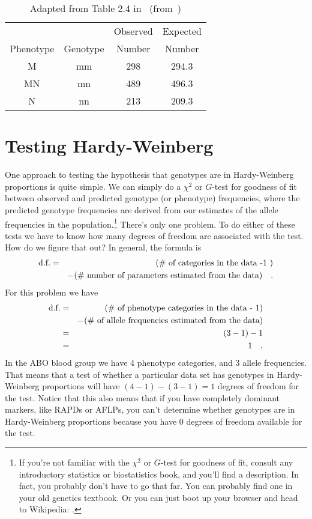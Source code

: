 \documentclass[12pt]{article}
\begin{document}
\begin{table}
\begin{center}
\begin{tabular}{cccc}
\hline\hline
          &          & Observed & Expected \\
Phenotype & Genotype & Number   & Number   \\
\hline
M         & mm       & 298      & 294.3 \\
MN        & mn       & 489      & 496.3 \\
N         & nn       & 213      & 209.3 \\
\hline
\end{tabular}
\end{center}
\caption{Adapted from Table 2.4 in~\cite{Hedrick-2000}
  (from~\cite{Cleghorn-1960})}\label{table:MN-data}
\end{table}

\section*{Testing Hardy-Weinberg}

One approach to testing the hypothesis that genotypes are in
Hardy-Weinberg proportions is quite simple. We can simply do a
$\chi^2$ or $G$-test for goodness of fit between observed and
predicted genotype (or phenotype) frequencies, where the predicted
genotype frequencies are derived from our estimates of the allele
frequencies in the population.\footnote{If you're not familiar with
  the $\chi^2$ or $G$-test for goodness of fit, consult any
  introductory statistics or biostatistics book, and you'll find a
  description. In fact, you probably don't have to go that far. You
  can probably find one in your old genetics textbook. Or you can just
  boot up your browser and head to Wikipedia:
  . } There's only one problem. To do
either of these tests we have to know how many degrees of freedom are
associated with the test. How do we figure that out? In general, the
formula is
\begin{eqnarray*}
\hbox{d.f.} &=& (\hbox{\# of categories in the data -1 }) \\
&&- (\hbox{\#
              number of parameters estimated from the data}) \quad .
\end{eqnarray*}
For this problem we have
\begin{eqnarray*}
\hbox{d.f.} &=& (\hbox{\# of phenotype categories in the data - 1}) \\
&&- (\hbox{\# of allele frequencies estimated from the data}) \\
&=& (3-1) - 1 \\
&=& 1 \quad .
\end{eqnarray*}
In the ABO blood group we have 4 phenotype categories, and 3
allele frequencies. That means that a test of whether a particular
data set has genotypes in Hardy-Weinberg proportions will have
$(4-1)-(3-1) = 1$ degrees of freedom for the test. Notice that this
also means that if you have completely dominant markers, like RAPDs or
AFLPs, you can't determine whether genotypes are in Hardy-Weinberg
proportions because you have 0 degrees of freedom available for the
test.
\end{document}
